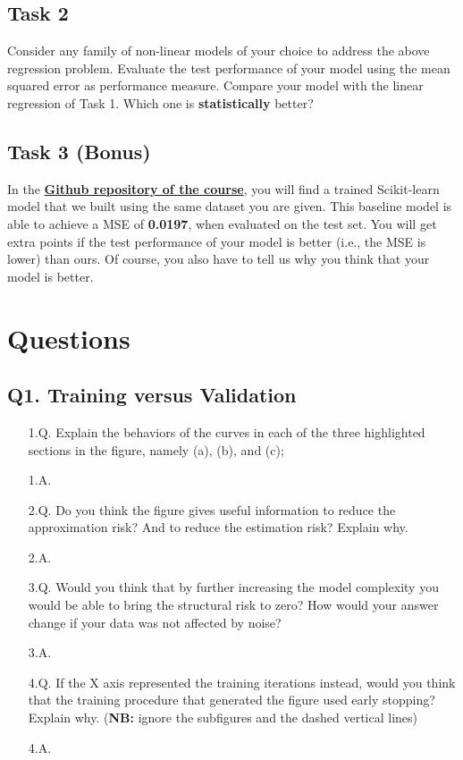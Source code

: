 \documentclass[11pt]{scrartcl}
\begin{document}
\subsection{Task 2}
Consider any family of non-linear models of your choice to address the above regression problem. Evaluate the test performance of your model using the mean squared error as performance measure. Compare your model with the linear regression of Task 1. Which one is \textbf{statistically} better?

\subsection{Task 3 (Bonus)}
In the \href{https://github.com/ascarrambad/ml-21-22}{\textbf{Github repository of the course}}, you will find a trained Scikit-learn model that we built using the same dataset you are given. This baseline model is able to achieve a MSE of \textbf{0.0197}, when evaluated on the test set. You will get extra points if the test performance of your model is better (i.e., the MSE is lower) than ours. Of course, you also have to tell us why you think that your model is better.


\newpage
\section{Questions}

\subsection{Q1. Training versus Validation}
\begin{itemize}
\item[1.Q.] Explain the behaviors of the curves in each of the three highlighted sections in the figure, namely (a), (b), and (c);
\item[1.A.] ~\\
\item[2.Q.] Do you think the figure gives useful information to reduce the approximation risk? And to reduce the estimation risk? Explain why.
\item[2.A.] ~\\
\item[3.Q.] Would you think that by further increasing the model complexity you would be able to bring the structural risk to zero? How would your answer change if your data was not affected by noise?
\item[3.A.] ~\\
\item[4.Q.] If the X axis represented the training iterations instead, would you think that the training procedure that generated the figure used early stopping? Explain why. (\textbf{NB:} ignore the subfigures and the dashed vertical lines)
\item[4.A.] ~\\
\end{itemize}
\end{document}
